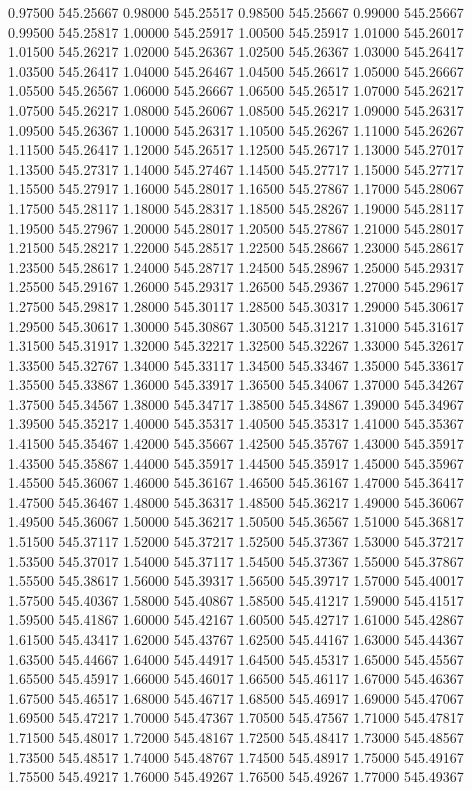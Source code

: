 {0.97500 545.25667
0.98000 545.25517
0.98500 545.25667
0.99000 545.25667
0.99500 545.25817
1.00000 545.25917
1.00500 545.25917
1.01000 545.26017
1.01500 545.26217
1.02000 545.26367
1.02500 545.26367
1.03000 545.26417
1.03500 545.26417
1.04000 545.26467
1.04500 545.26617
1.05000 545.26667
1.05500 545.26567
1.06000 545.26667
1.06500 545.26517
1.07000 545.26217
1.07500 545.26217
1.08000 545.26067
1.08500 545.26217
1.09000 545.26317
1.09500 545.26367
1.10000 545.26317
1.10500 545.26267
1.11000 545.26267
1.11500 545.26417
1.12000 545.26517
1.12500 545.26717
1.13000 545.27017
1.13500 545.27317
1.14000 545.27467
1.14500 545.27717
1.15000 545.27717
1.15500 545.27917
1.16000 545.28017
1.16500 545.27867
1.17000 545.28067
1.17500 545.28117
1.18000 545.28317
1.18500 545.28267
1.19000 545.28117
1.19500 545.27967
1.20000 545.28017
1.20500 545.27867
1.21000 545.28017
1.21500 545.28217
1.22000 545.28517
1.22500 545.28667
1.23000 545.28617
1.23500 545.28617
1.24000 545.28717
1.24500 545.28967
1.25000 545.29317
1.25500 545.29167
1.26000 545.29317
1.26500 545.29367
1.27000 545.29617
1.27500 545.29817
1.28000 545.30117
1.28500 545.30317
1.29000 545.30617
1.29500 545.30617
1.30000 545.30867
1.30500 545.31217
1.31000 545.31617
1.31500 545.31917
1.32000 545.32217
1.32500 545.32267
1.33000 545.32617
1.33500 545.32767
1.34000 545.33117
1.34500 545.33467
1.35000 545.33617
1.35500 545.33867
1.36000 545.33917
1.36500 545.34067
1.37000 545.34267
1.37500 545.34567
1.38000 545.34717
1.38500 545.34867
1.39000 545.34967
1.39500 545.35217
1.40000 545.35317
1.40500 545.35317
1.41000 545.35367
1.41500 545.35467
1.42000 545.35667
1.42500 545.35767
1.43000 545.35917
1.43500 545.35867
1.44000 545.35917
1.44500 545.35917
1.45000 545.35967
1.45500 545.36067
1.46000 545.36167
1.46500 545.36167
1.47000 545.36417
1.47500 545.36467
1.48000 545.36317
1.48500 545.36217
1.49000 545.36067
1.49500 545.36067
1.50000 545.36217
1.50500 545.36567
1.51000 545.36817
1.51500 545.37117
1.52000 545.37217
1.52500 545.37367
1.53000 545.37217
1.53500 545.37017
1.54000 545.37117
1.54500 545.37367
1.55000 545.37867
1.55500 545.38617
1.56000 545.39317
1.56500 545.39717
1.57000 545.40017
1.57500 545.40367
1.58000 545.40867
1.58500 545.41217
1.59000 545.41517
1.59500 545.41867
1.60000 545.42167
1.60500 545.42717
1.61000 545.42867
1.61500 545.43417
1.62000 545.43767
1.62500 545.44167
1.63000 545.44367
1.63500 545.44667
1.64000 545.44917
1.64500 545.45317
1.65000 545.45567
1.65500 545.45917
1.66000 545.46017
1.66500 545.46117
1.67000 545.46367
1.67500 545.46517
1.68000 545.46717
1.68500 545.46917
1.69000 545.47067
1.69500 545.47217
1.70000 545.47367
1.70500 545.47567
1.71000 545.47817
1.71500 545.48017
1.72000 545.48167
1.72500 545.48417
1.73000 545.48567
1.73500 545.48517
1.74000 545.48767
1.74500 545.48917
1.75000 545.49167
1.75500 545.49217
1.76000 545.49267
1.76500 545.49267
1.77000 545.49367
}

